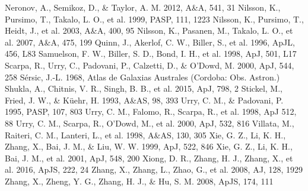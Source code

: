 \documentclass[structabstract]{raa}
\begin{document}
\begin{thebibliography}{99}
 Neronov, A., Semikoz, D., \& Taylor, A. M. 2012, A\&A, 541, 31
 Nilsson, K., Pursimo, T., Takalo, L. O., et al. 1999, PASP, 111, 1223
 Nilsson, K., Pursimo, T., Heidt, J., et al. 2003, A\&A, 400, 95
 Nilsson, K., Pasanen, M., Takalo, L. O., et al. 2007, A\&A, 475, 199
 Quinn, J., Akerlof, C. W., Biller, S., et al. 1996, ApJL, 456, L83
 Samuelson, F. W., Biller, S. D., Bond, I. H., et al. 1998, ApJ, 501, L17
 Scarpa, R., Urry, C., Padovani, P., Calzetti, D., \& O'Dowd, M. 2000, ApJ, 544, 258
 S\'{e}rsic, J.-L. 1968, Atlas de Galaxias Australes (Cordoba: Obs. Astron.)
 Shukla, A., Chitnis, V. R., Singh, B. B., et al. 2015, ApJ, 798, 2
 Stickel, M., Fried, J. W., \& K\"{u}ehr, H. 1993, A\&AS, 98, 393
 Urry, C. M., \& Padovani, P. 1995, PASP, 107, 803
 Urry, C. M., Falomo, R., Scarpa, R., et al. 1998, ApJ 512, 88
 Urry, C. M., Scarpa, R., O'Dowd, M., et al. 2000, ApJ, 532, 816
 Villata, M., Raiteri, C. M., Lanteri, L., et al. 1998, A\&AS, 130, 305
 Xie, G. Z., Li, K. H., Zhang, X., Bai, J. M., \& Liu, W. W. 1999, ApJ, 522, 846
 Xie, G. Z., Li, K. H., Bai, J. M., et al. 2001, ApJ, 548, 200
 Xiong, D. R., Zhang, H. J., Zhang, X., et al. 2016, ApJS, 222, 24
 Zhang, X., Zhang, L., Zhao, G., et al. 2008, AJ, 128, 1929
 Zhang, X., Zheng, Y. G., Zhang, H. J., \& Hu, S. M. 2008, ApJS, 174, 111

\end{thebibliography}
\end{document}
